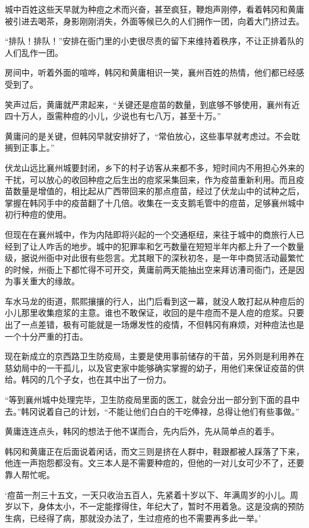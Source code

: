 城中百姓这些天早就为种痘之术而兴奋，甚至疯狂，鞭炮声刚停，看着韩冈和黄庸被引进去喝茶，身影刚刚消失，外面等候已久的人们拥作一团，向着大门挤过去。

“排队！排队！”安排在衙门里的小吏很尽责的留下来维持着秩序，不让正排着队的人们乱作一团。

房间中，听着外面的喧哗，韩冈和黄庸相识一笑，襄州百姓的热情，他们都已经感受到了。

笑声过后，黄庸就严肃起来，“关键还是痘苗的数量，到底够不够使用，襄州有近四十万人，亟需种痘的小儿，少说也有七八万，甚至十万。”

黄庸问的是关键，但韩冈早就安排好了，“常伯放心，这些事早就考虑过。不会耽搁到正事上。”

伏龙山远比襄州城要封闭，乡下的村子访客从来都不多，短时间内不用担心外来的干扰，可以放心的收回种痘之后生出的痘浆采集回来，作为疫苗重新利用。而且疫苗数量是增值的，相比起从广西带回来的那点痘苗，经过了伏龙山中的试种之后，掌握在韩冈手中的疫苗翻了十几倍。收集在一支支鹅毛管中的痘苗，足够襄州城中初行种痘的使用。

但现在在襄州城中，作为内陆即将兴起的一个交通枢纽，来往于城中的商旅行人已经到了让人咋舌的地步。城中的犯罪率和乞丐数量在短短半年内都上升了一个数量级，据说州衙中对此很有些怨言。尤其眼下的深秋初冬，是一年中商贸活动最繁忙的时候，州衙上下都忙得不可开交，黄庸前两天能抽出空来拜访漕司衙门，还是因为事关重大的缘故。

车水马龙的街道，熙熙攘攘的行人，出门后看到这一幕，就没人敢打起从种痘后的小儿那里收集痘浆的主意。谁也不敢保证，收回的是牛痘而不是人痘的痘浆。只要出了一点差错，极有可能就是一场爆发性的疫情，不但韩冈有麻烦，对种痘法也是一个十分严重的打击。

现在新成立的京西路卫生防疫局，主要是使用事前储存的干苗，另外则是利用养在慈幼局中的一干孤儿，以及官吏家中能够确实掌握的幼子，用他们来保证疫苗的供给。韩冈的几个子女，也在其中出了一份力。

“等到襄州城中处理完毕，卫生防疫局里面的医工，就会分出一部分到下面的县中去。”韩冈说着自己的计划，“不能让他们白白的干吃俸禄，总得让他们有些事做。”

黄庸连连点头，韩冈的想法于他不谋而合，先内后外，先从简单点的着手。

韩冈和黄庸正在后面说着闲话，而文三则是挤在人群中，鞋跟都被人踩落了下来，他连一声抱怨都没有。文三本人是不需要种痘的，但他的一对儿女可少不了，还要靠人帮忙呢。

‘痘苗一剂三十五文，一天只收治五百人，先紧着十岁以下、年满周岁的小儿。周岁以下，身体太小，不一定能撑得住，年纪大了，暂时不用着急。这是没病的预防生病，已经得了病，那就没办法了，生过痘疮的也不需要再多此一举。’

